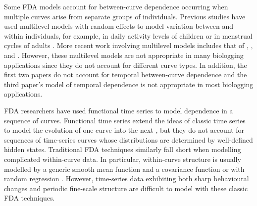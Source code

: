 
Some FDA models account for between-curve dependence occurring when multiple curves arise from separate groups of individuals. 
Previous studies have used multilevel models with random effects to model variation between and within individuals, for example, in daily activity levels of children \citep{Morris:2007} or in menstrual cycles of adults \citep{Bromback:1998}. More recent work involving multilevel models includes that of \citet{Di:2009}, \citet{Crainiceanu:2009}, and \citet{Chen:2012}. However, these multilevel models are not appropriate in many biologging applications since they do not account for different curve types. In addition, the first two papers do not account for temporal between-curve dependence and the third paper's model of temporal dependence is not appropriate in most biologging applications.

FDA researchers have used functional time series to model dependence in a sequence of curves. Functional time series extend the ideas of classic time series to model the evolution of one curve into the next \citep{Kokoszka:2018}, but they do not account for sequences of time-series curves whose distributions are determined by well-defined hidden states.
%
Traditional FDA techniques similarly fall short when modelling complicated within-curve %
data. In particular, within-curve structure is usually modelled by a generic smooth mean function and a covariance function \citep{Yao:2005} 
or with random regression \citep{Rice:2001}. 
However, time-series data exhibiting both sharp behavioural changes and periodic fine-scale structure are difficult to model with these classic FDA techniques.

